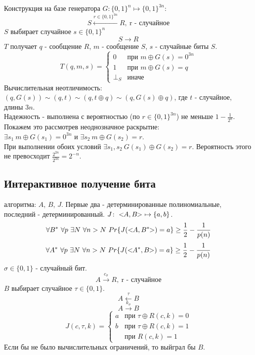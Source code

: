 \documentclass[a4paper]{article}
\theoremstyle{definition}
\theoremstyle{plain}
\begin{document}
\noindent Конструкция на базе генератора $G\colon \{0, 1\}^{n} \mapsto \{0, 1\}^{3n}$:
$$
	S \xleftarrow{r\in \{0, 1\}^{3n}} R,\ \text{r - случайное}
$$
$S$ выбирает случайное $s \in \{0, 1\}^n$ 
$$
	S \longrightarrow R
$$
$T$ получает $q$ - сообщение $R$, $m$ - сообщение $S$, $s$ - случайные биты $S$.
$$
	T(q, m, s) =
	\begin{cases}
   		0       & \text{при   } m \oplus G(s) = 0^{3n} \\
   		1       & \text{при   } m \oplus G(s) = q \\
   		\perp_S & \text{иначе}
  	\end{cases}
$$
Вычислительная неотличимость: $(q, G(s)) \sim (q, t) \sim (q, t \oplus q) \sim (q, G(s) \oplus q)$,
где $t$ - случайное, длины $3n$.~\\

\noindent Надежность - выполнена с вероятностью (по $r \in \{0, 1\}^{3n}$) не меньше $1 - \frac{1}{2^n}$.
Покажем это рассмотрев неоднозначное раскрытие:~\\
$\exists s_1\ m \oplus G(s_1) = 0^{3n}$ и $\exists s_2\ m \oplus G(s_2) = r$.~\\
При выполнении обоих условий $\exists s_1, s_2\ G(s_1) \oplus G(s_2) = r$.
Вероятность этого не превосходит $\frac{2^{2n}}{2^{3n}} = 2^{-n}$.

\subsection{Интерактивное получение бита}

 алгоритма: $A$, $B$, $J$. Первые два - детерминированные полиномиальные, последний - 
детерминированный. $J\colon <\mkern-6mu A, B \mkern-6mu>\ \mapsto \{a, b\}$.
$$
	\forall B^*\ \forall p\ \exists N\ \forall n > N\ Pr\{J(<\mkern-6mu A, B^* \mkern-6mu>) = a\} \ge \frac{1}{2} - \frac{1}{p(n)}
$$
$$
	\forall A^*\ \forall p\ \exists N\ \forall n > N\ Pr\{J(<\mkern-6mu A^*, B \mkern-6mu>) = a\} \ge \frac{1}{2} - \frac{1}{p(n)}
$$
$\sigma \in \{0, 1\}$ - случайный бит.
$$
	A \xrightarrow{c_{\sigma}} R,\ \text{r - случайное}
$$
$B$ выбирает случайное $\tau \in \{0, 1\}$.
$$
	A \xleftarrow{\tau} B
$$
$$
	A \xrightarrow{k_{\sigma}} B
$$
$$
	J(c, \tau, k) =
	\begin{cases}
   		a       & \text{при   } \tau \oplus R(c, k) = 0 \\
   		b       & \text{при   } \tau \oplus R(c, k) = 1 \\
   			    & \text{при   } R(c, k) = 1
  	\end{cases}
$$
Если бы не было вычислительных ограничений, то выйграл бы $B$.
\end{document}
